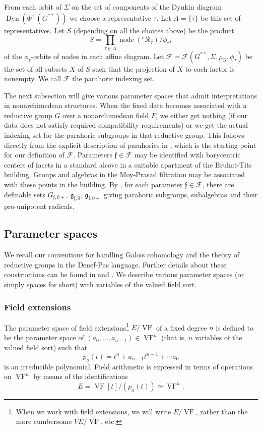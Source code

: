 \documentclass[12pt]{amsart}
\newcommand{\op}[1]{\operatorname{#1}}
\newcommand{\cal}[1]{\mathcal{#1}}
\def\VF{{\op{VF}}}
\def\R{\cal{R}}
\def\s{{\mathfrak{f}}}
\newcommand{\cF}{\mathcal{F}}
\newcommand{\fg}{\mathfrak{g}}
\theoremstyle{plain}
\theoremstyle{definition}
\begin{document}
From each orbit of $\Sigma$ on the set of components of the Dynkin
diagram $\op{Dyn}(\Phi^+(G^{**}))$ we choose a representative
$\tau$.  Let $A = \{\tau\}$ be this set of representatives.  Let
$S$ (depending on all the choices above) be the product
\[
S = \prod_{\tau\in A} \op{node}({}^e\R_\tau)/\phi_\tau,
\]
of the $\phi_\tau$-orbits of nodes in each affine diagram.  Let $\cF
= \cF(G^{**},\Sigma,\rho_G,\phi_\tau)$ be the set of all
subsets $X$ of $S$ such that the projection of $X$ to each factor is
nonempty.  We call $\cF$ the parahoric indexing set.

The next subsection will give various parameter spaces that admit
interpretations in nonarchimedean structures.  When the fixed data
becomes associated with a reductive group $G$ over a nonarchimedean
field $F$, we either get nothing (if our data does not satisfy
required compatibility requirements) or we get the actual indexing set
for the parahoric subgroups in that reductive group.  This follows
directly from the explicit description of parahorics in \cite{Gross},
which is the starting point for our definition of $\cF$.  Parameters
$\s\in \cF$ may be identified with barycentric centers of facets in a
standard alcove in a suitable apartment of the Bruhat-Tits building.
Groups and algebras in the Moy-Prasad filtration may be associated
with these points in the building.  By \cite{CGH}, for each parameter
$\s\in \cF$, there are definable sets $G_{\s,0+}$,
$\fg_{\s,0}$, $\fg_{\s,0+}$ giving parahoric subgroups, subalgebras
and their pro-unipotent radicals.


\subsection{Parameter spaces}

We recall our conventions for handling Galois cohomology and the
theory of reductive groups in the Denef-Pas language.  Further details
about these constructions can be found in \cite{CHL} and \cite{CGH}.
We describe
various parameter spaces (or simply spaces for short) with variables of
the valued field sort.  


\subsubsection{Field extensions}

The parameter space of field extensions\footnote{When we work with
  field extensions, we will write $E/\VF$, rather than the more
  cumbersome $VE/\VF$, etc.} $E/\VF$ of a fixed degree $n$ is defined
to be the parameter space of $(a_0,\ldots,a_{n-1})\in \VF^n$ (that is,
$n$ variables of the valued field sort) such that
\[
p_a(t) = t^n + a_{n-1} t^{n-1} + \cdots a_0
\]
is an irreducible polynomial.  Field arithmetic is expressed in terms
of operations on $\VF^n$ by means of the identifications
\[
E = \VF[t]/(p_a(t)) \simeq \VF^n.
\]
\end{document}
